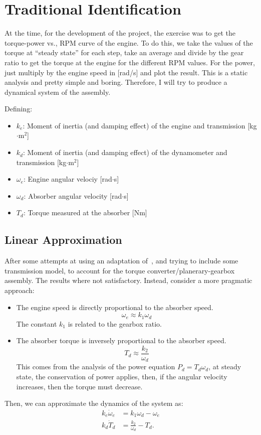 \documentclass{article}
\begin{document}
\section{Traditional Identification}\label{sec:Traditional Identification} %
At the time, for the development of the project, the exercise was to get the torque-power vs., RPM curve of the engine. To do this, we take the values of the torque at ``steady state'' for each step, take an average and divide by the gear ratio to get the torque at the engine for the different RPM values. For the power, just multiply by the engine speed in [rad/s] and plot the result. This is a static analysis and pretty simple and boring. Therefore, I will try to produce a dynamical system of the assembly. 

Defining:
\begin{itemize}
	\item $k_e$: Moment of inertia (and damping effect) of the engine and transmission [kg$\cdot$m$^2$]
	\item $k_d$: Moment of inertia (and damping effect) of the dynamometer and transmission [kg$\cdot$m$^2$]
	\item $\omega_e$: Engine angular velociy [rad$\cdot$s]
	\item $\omega_d$: Absorber angular velocity [rad$\cdot$s]
	\item $T_d$: Torque measured at the absorber [Nm]
\end{itemize}
\subsection{Linear Approximation}\label{sub:Linear Approximation} %
After some attempts at using an adaptation of~\cite{Blumenschein2013}, and trying to include some transmission model, to account for the torque converter/planerary-gearbox assembly. The results where not satisfactory. Instead, consider a more pragmatic approach:
\begin{itemize}
	\item The engine speed is directly proportional to the absorber speed. 
		\[
			\omega_e \approx k_1\omega_d
		\]
		The constant $k_1$ is related to the gearbox ratio. 
	\item The absorber torque is inversely proportional to the absorber speed.
		\[
			T_d \approx \frac{k_2}{\omega_d}
		\]
		This comes from the analysis of the power equation $P_d=T_d\omega_d$, at steady state, the conservation of power applies, then, if the angular velocity increases, then the torque must decrease.
\end{itemize}
Then, we can approximate the dynamics of the system as:
\begin{align}
	k_e\dot{\omega}_{e} & = k_1\omega_d - \omega_e\\
	k_d\dot{T}_d & = \frac{k_2}{\omega_d} - T_d.
\end{align}
\end{document}
